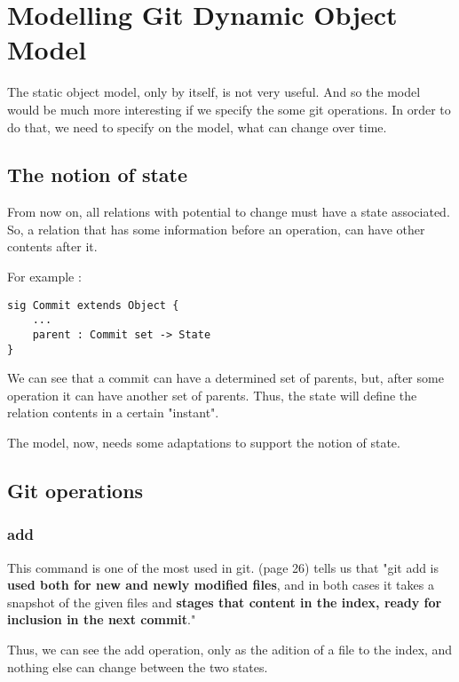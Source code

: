 \section {Modelling Git Dynamic Object Model}

The static object model, only by itself, 
is not very useful. And so
the model would be much more interesting if we specify 
the some git operations. In order to do that, we need to 
specify on the model, what can change over time.

\subsection{The notion of state}

From now on, all relations with potential to change must
have a state associated. So, a relation
that has some information before an operation, can have
other contents after it. \par
For example :

\begin{lstlisting}
sig Commit extends Object {
	...
	parent : Commit set -> State
}
\end{lstlisting}

We can see that a commit can have a determined set of parents, but, 
after some operation it can have another set of parents. Thus, the state
will define the relation contents in a certain "instant".
\par
The model, now, needs some adaptations to support the notion of state. \par


\subsection{Git operations}

\subsubsection{add}

This command is one of the most used in git. \cite{gitComm} (page 26)
tells us that
"git add is {\bf used both for new and newly modified files},
and in both cases it takes a snapshot of the given files
and {\bf stages that content in the index, ready for inclusion
in the next commit}." \par 
Thus, we can see the add operation, only as the adition of a file 
to the index, and nothing else can change between the two states.
\par

